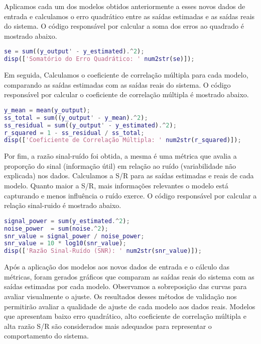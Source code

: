 \documentclass[a4paper,12pt]{article}
\begin{document}
Aplicamos cada um dos modelos obtidos anteriormente a esses novos dados de entrada e calculamos o erro quadrático entre as saídas estimadas e as saídas reais do sistema. O código responsável por calcular a soma dos erros ao quadrado é mostrado abaixo.
\begin{lstlisting}[language=Matlab, caption=Calculo do somatório dos erros ao quadrado.]
% Cálculo do somatório do erro quadrático
se = sum((y_output' - y_estimated).^2);
disp(['Somatório do Erro Quadrático: ' num2str(se)]);
\end{lstlisting}

Em seguida, Calculamos o coeficiente de correlação múltipla para cada modelo, comparando as saídas estimadas com as saídas reais do sistema. O código responsável por calcular o coeficiente de correlação múltipla é mostrado abaixo.
\begin{lstlisting}[language=Matlab, caption=Calculo do coeficiente de correlação multipla.]
% Cálculo do coeficiente de correlação múltipla
y_mean = mean(y_output);
ss_total = sum((y_output' - y_mean).^2);
ss_residual = sum((y_output' - y_estimated).^2);
r_squared = 1 - ss_residual / ss_total;
disp(['Coeficiente de Correlação Múltipla: ' num2str(r_squared)]);
\end{lstlisting}

Por fim, a razão sinal-ruído foi obtida, a mesma é uma métrica que avalia a proporção do sinal (informação útil) em relação ao ruído (variabilidade não explicada) nos dados. Calculamos a S/R para as saídas estimadas e reais de cada modelo. Quanto maior a S/R, mais informações relevantes o modelo está capturando e menos influência o ruído exerce. O código responsável por calcular a relação sinal-ruido é mostrado abaixo.
\begin{lstlisting}[language=Matlab, caption=Calculo da relação sinal-ruido.]
% Cálculo razão sinal-ruido
signal_power = sum(y_estimated.^2);
noise_power  = sum(noise.^2);
snr_value = signal_power / noise_power;
snr_value = 10 * log10(snr_value);
disp(['Razão Sinal-Ruído (SNR): ' num2str(snr_value)]);
\end{lstlisting}

Após a aplicação dos modelos aos novos dados de entrada e o cálculo das métricas, foram gerados gráficos que comparam as saídas reais do sistema com as saídas estimadas por cada modelo. Observamos a sobreposição das curvas para avaliar visualmente o ajuste. Os resultados desses métodos de validação nos permitirão avaliar a qualidade de ajuste de cada modelo aos dados reais. Modelos que apresentam baixo erro quadrático, alto coeficiente de correlação múltipla e alta razão S/R são considerados mais adequados para representar o comportamento do sistema.
\end{document}
